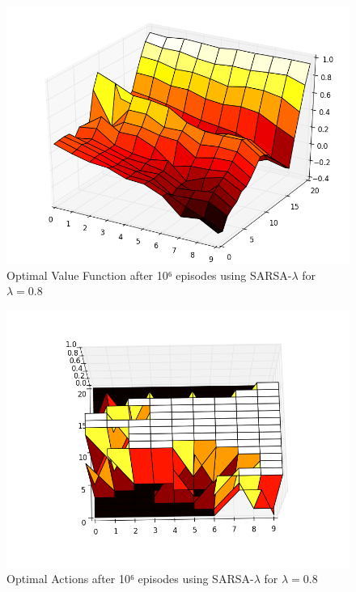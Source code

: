 \documentclass[12pt,a4paper]{article}
\begin{document}
\begin{figure}[!ht]
   \caption{\label{E21_SL_V} Optimal Value Function after 10⁶ episodes using SARSA-$\lambda$ for $\lambda=0.8$}
   \includegraphics[scale=0.4]{Easy21_Results/Sarsa_lambda_0_8_value_1e6.png}
\end{figure}

\begin{figure}[!ht]
   \caption{\label{E21_SL_D} Optimal Actions after 10⁶ episodes using SARSA-$\lambda$ for $\lambda=0.8$}
   \includegraphics[scale=0.4]{Easy21_Results/Sarsa_lambda_0_8_decision_1e6.png}
\end{figure}
\end{document}
